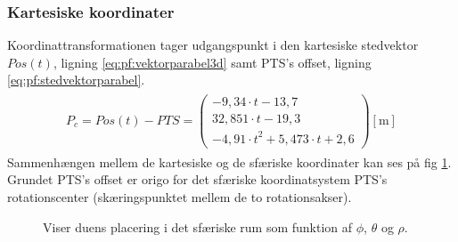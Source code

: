 \subsubsection{Kartesiske koordinater}
Koordinattransformationen tager udgangspunkt i den kartesiske stedvektor \(Pos\left(t\right) \), ligning \ref{eq:pf:vektorparabel3d} samt PTS's offset, ligning \ref{eq:pf:stedvektorparabel}.
\begin{align}
\begin{split}
{ P }_{ c }=Pos\left( t \right) -PTS = \left( \begin{matrix} - 9,34\cdot t-13,7 \\32,851\cdot t-19,3
\\-{ 4,91\cdot t }^{ 2 }+5,473\cdot t+2,6\end{matrix} \right) [\text{m}]
\label{eq:pf:stedvektorparabel}
\end{split}
\end{align}
Sammenhængen mellem de kartesiske og de sfæriske koordinater kan ses på fig \ref{fig:thetaphi_degree}. 
Grundet PTS's offset er origo for det sfæriske koordinatsystem PTS's rotationscenter (skæringspunktet mellem de to rotationsakser).

\begin{figure}[!th]
\centering
\begin{tikzpicture}[scale=4]

\end{tikzpicture}
\caption[Sfærisk koordinatsystem til koordinattransformation]{Viser duens placering i det sfæriske rum som funktion af  \(\phi\), \(\theta\) og \(\rho\).}
\label{fig:thetaphi_degree}
\end{figure}

